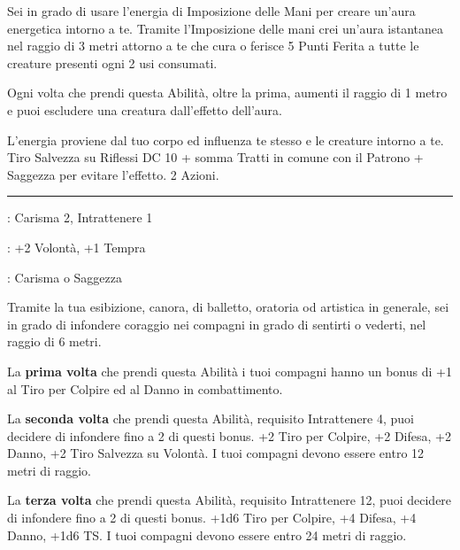 \begin{multicols}{2}
Sei in grado di usare l'energia di Imposizione delle Mani per creare un'aura energetica intorno a te.
Tramite l'Imposizione delle mani crei un'aura istantanea nel raggio di 3 metri attorno a te che cura o ferisce 5 Punti Ferita a tutte le creature presenti ogni 2 usi consumati.

Ogni volta che prendi questa Abilità, oltre la prima, aumenti il raggio di 1 metro e puoi escludere una creatura dall'effetto dell'aura.

L'energia proviene dal tuo corpo ed influenza te stesso e le creature intorno a te. Tiro Salvezza su Riflessi DC 10 + somma Tratti in comune con il Patrono + Saggezza per evitare l'effetto.  2 Azioni.

%

\smallskip\noindent\rule{\linewidth}{2pt} \hypertarget{Infondere Coraggio}{}\medskip{}
\noindent
\begin{description}[noitemsep, topsep=0pt, parsep=0pt, partopsep=0pt, leftmargin=0cm, labelwidth=2.5cm]
    \item[\textbf{Requisito}]: Carisma 2, Intrattenere 1
    \item[\textbf{Tiri Salvezza}]: +2 Volontà, +1 Tempra
    \item[\textbf{Caratteristica}]: Carisma o Saggezza
\end{description}

Tramite la tua esibizione, canora, di balletto, oratoria od artistica in generale, sei in grado di infondere coraggio nei compagni in grado di sentirti o vederti, nel raggio di 6 metri.

La \textbf{prima volta} che prendi questa Abilità i tuoi compagni hanno un bonus di +1 al Tiro per Colpire ed al Danno in combattimento.

La \textbf{seconda volta} che prendi questa Abilità, requisito Intrattenere 4, puoi decidere di infondere fino a 2 di questi bonus. +2 Tiro per Colpire, +2 Difesa, +2 Danno, +2 Tiro Salvezza su Volontà. I tuoi compagni devono essere entro 12 metri di raggio.

La \textbf{terza volta} che prendi questa Abilità, requisito Intrattenere 12, puoi decidere di infondere fino a 2 di questi bonus. +1d6 Tiro per Colpire, +4 Difesa, +4 Danno, +1d6 TS. I tuoi compagni devono essere entro 24 metri di raggio.


\end{multicols}
